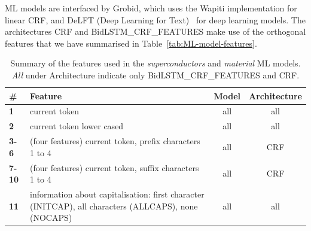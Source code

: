 ML models are interfaced by Grobid, which uses the Wapiti\cite{lavergne2010practical} implementation for linear CRF, and DeLFT (Deep Learning for Text)~\cite{DeLFT} for deep learning models.
The architectures CRF and BidLSTM\_CRF\_FEATURES make use of the orthogonal features that we have summarised in Table~\ref{tab:ML-model-features}.

\begin{table}
    \centering
    \caption{Summary of the features used in the \textit{superconductors} and \textit{material} ML models. \textit{All} under Architecture indicate only BidLSTM\_CRF\_FEATURES and CRF.}
    \begin{tabular}{l m{30em} c c}
        \toprule
        \textbf{\#}   & \textbf{Feature}                                                                                                                                                                                                                                         & \textbf{Model}  & \textbf{Architecture} \\
        \midrule
        \textbf{1}    & current token                                                                                                                                                                                                                                            & all             & all                   \\
        \textbf{2}    & current token lower cased                                                                                                                                                                                                                                & all             & all                   \\
        \textbf{3-6}  & (four features) current token, prefix characters 1 to 4                                                                                                                                                                                                  & all             & CRF                   \\
        \textbf{7-10} & (four features) current token, suffix characters 1 to 4                                                                                                                                                                                                  & all             & CRF                   \\
        \textbf{11}   & information about capitalisation: first character (INITCAP), all characters (ALLCAPS), none (NOCAPS)                                                                                                                                                     & all             & all                   \\

\end{tabular}
\end{table}
